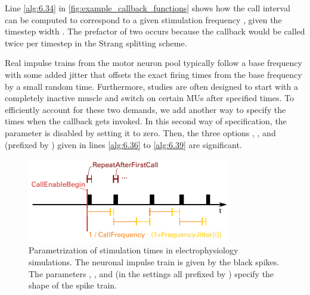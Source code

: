 Line \ref{alg:6.34} in \cref{fig:example_callback_functions} shows how the call interval can be computed to correspond to a given stimulation frequency , given the timestep width . The prefactor of two occurs because the callback would be called twice per timestep in the Strang splitting scheme.

Real impulse trains from the motor neuron pool typically follow a base frequency with some added jitter that offsets the exact firing times from the base frequency by a small random time. Furthermore, studies are often designed to start with a completely inactive muscle and switch on certain MUs after specified times. To efficiently account for these two demands, we add another way to specify the times when the  callback gets invoked. In this second way of specification, the  parameter is disabled by setting it to zero. Then, the three options , ,  and  (prefixed by ) given in lines \ref{alg:6.36} to \ref{alg:6.39} are significant. 

\begin{figure}%
  \centering%
  \includegraphics[width=0.8\textwidth]{images/implementation/stimulation_times.pdf}%
  \caption{Parametrization of stimulation times in electrophysiology simulations. The neuronal impulse train is given by the black spikes. The parameters , ,  and  (in the settings all prefixed by ) specify the shape of the spike train.}%
  \label{fig:stimulation_times}%
\end{figure}%

